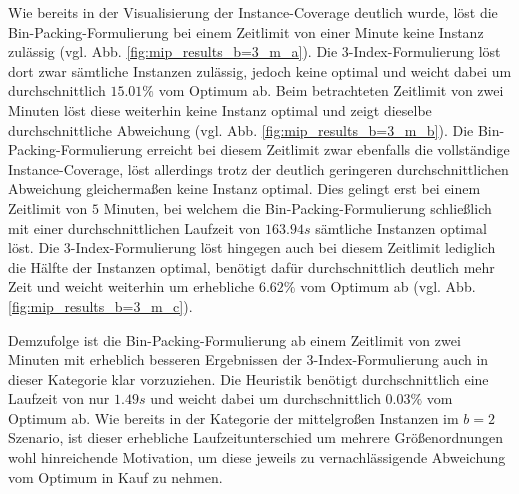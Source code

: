 Wie bereits in der Visualisierung der Instance-Coverage deutlich wurde, löst die Bin-Packing-Formulierung
bei einem Zeitlimit von einer Minute keine Instanz zulässig (vgl. Abb. \ref{fig:mip_results_b=3_m_a}).
Die 3-Index-Formulierung löst dort zwar sämtliche Instanzen zulässig, jedoch keine optimal und weicht
dabei um durchschnittlich $15.01 \%$ vom Optimum ab. Beim betrachteten Zeitlimit von zwei Minuten
löst diese weiterhin keine Instanz optimal und zeigt dieselbe durchschnittliche Abweichung
(vgl. Abb. \ref{fig:mip_results_b=3_m_b}). Die Bin-Packing-Formulierung erreicht bei diesem Zeitlimit zwar ebenfalls
die vollständige Instance-Coverage, löst allerdings trotz der deutlich geringeren durchschnittlichen Abweichung
gleichermaßen keine Instanz optimal. Dies gelingt erst bei einem Zeitlimit von $5$ Minuten, bei welchem die Bin-Packing-Formulierung schließlich mit einer durchschnittlichen Laufzeit von $163.94s$ sämtliche Instanzen optimal löst. Die 3-Index-Formulierung löst hingegen auch bei diesem Zeitlimit lediglich die Hälfte der Instanzen optimal, benötigt dafür durchschnittlich deutlich mehr Zeit und weicht weiterhin um erhebliche $6.62 \%$ vom
Optimum ab (vgl. Abb. \ref{fig:mip_results_b=3_m_c}).


Demzufolge ist die Bin-Packing-Formulierung ab einem Zeitlimit von zwei Minuten mit erheblich besseren Ergebnissen der 3-Index-Formulierung auch in dieser Kategorie klar vorzuziehen.
Die Heuristik benötigt durchschnittlich eine Laufzeit von nur $1.49s$ und weicht dabei um durchschnittlich
$0.03 \%$ vom Optimum ab. Wie bereits in der Kategorie der mittelgroßen Instanzen im $b = 2$ Szenario, ist dieser erhebliche Laufzeitunterschied um mehrere Größenordnungen wohl hinreichende Motivation, um diese jeweils zu vernachlässigende Abweichung vom Optimum in Kauf zu nehmen.

